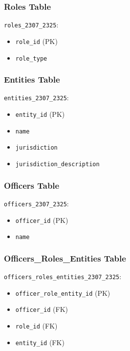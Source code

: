 \documentclass{article}
\begin{document}
\begin{minipage}{0.5\textwidth}

    \subsubsection*{Roles Table}
    \texttt{roles\_2307\_2325}:
    \begin{itemize}
        \item \texttt{role\_id} (PK)
        \item \texttt{role\_type}
    \end{itemize}

    \subsubsection*{Entities Table}
    \texttt{entities\_2307\_2325}:
    \begin{itemize}
        \item \texttt{entity\_id} (PK)
        \item \texttt{name}
        \item \texttt{jurisdiction}
        \item \texttt{jurisdiction\_description}
    \end{itemize}

    \subsubsection*{Officers Table}
    \texttt{officers\_2307\_2325}:
    \begin{itemize}
        \item \texttt{officer\_id} (PK)
        \item \texttt{name}
    \end{itemize}

    \subsubsection*{Officers\_Roles\_Entities Table}
    \texttt{officers\_roles\_entities\_2307\_2325}:
    \begin{itemize}
        \item \texttt{officer\_role\_entity\_id} (PK)
        \item \texttt{officer\_id} (FK)
        \item \texttt{role\_id} (FK)
        \item \texttt{entity\_id} (FK)
    \end{itemize}


\end{minipage}
\end{document}
